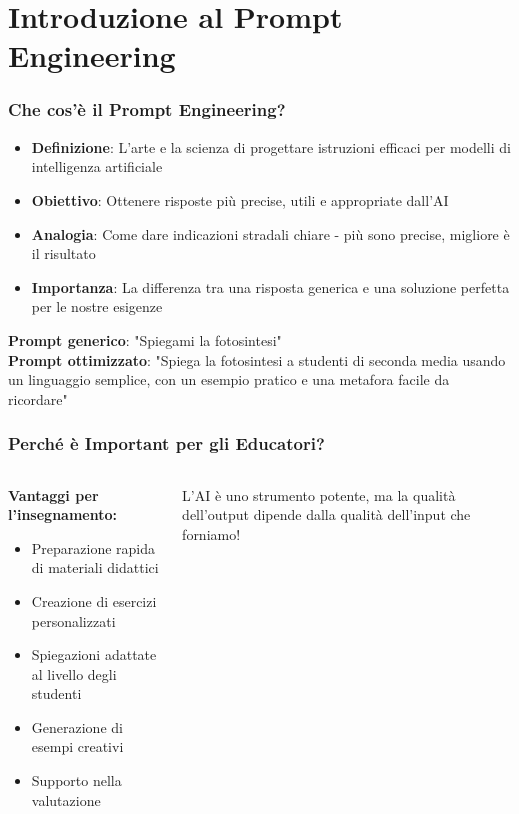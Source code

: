 \documentclass[aspectratio=169]{beamer}
\begin{document}
\section{Introduzione al Prompt Engineering}
%
%
\begin{frame}
\frametitle{Che cos'è il Prompt Engineering?}
\begin{itemize}[<+->]
    \item \textbf{Definizione}: L'arte e la scienza di progettare istruzioni efficaci per modelli di intelligenza artificiale
    \item \textbf{Obiettivo}: Ottenere risposte più precise, utili e appropriate dall'AI
    \item \textbf{Analogia}: Come dare indicazioni stradali chiare - più sono precise, migliore è il risultato
    \item \textbf{Importanza}: La differenza tra una risposta generica e una soluzione perfetta per le nostre esigenze
\end{itemize}

\pause
\begin{examplebox}
\textbf{Prompt generico}: "Spiegami la fotosintesi"\\
\textbf{Prompt ottimizzato}: "Spiega la fotosintesi a studenti di seconda media usando un linguaggio semplice, con un esempio pratico e una metafora facile da ricordare"
\end{examplebox}
\end{frame}
%
%
\begin{frame}
\frametitle{Perché è Important per gli Educatori?}
\begin{columns}
\begin{column}{0.6\textwidth}
\textbf{Vantaggi per l'insegnamento:}
\begin{itemize}
    \item Preparazione rapida di materiali didattici
    \item Creazione di esercizi personalizzati
    \item Spiegazioni adattate al livello degli studenti
    \item Generazione di esempi creativi
    \item Supporto nella valutazione
\end{itemize}
\end{column}
\begin{column}{0.4\textwidth}
\begin{tipbox}[Ricorda]
L'AI è uno strumento potente, ma la qualità dell'output dipende dalla qualità dell'input che forniamo!
\end{tipbox}
\end{column}
\end{columns}
\end{frame}
%
\end{document}
